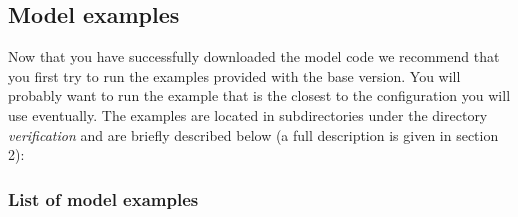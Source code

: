 \subsection{Model examples}

Now that you have successfully downloaded the model code we recommend that
you first try to run the examples provided with the base version. You will
probably want to run the example that is the closest to the configuration
you will use eventually. The examples are located in subdirectories under
the directory \textit{verification} and are briefly described below (a full
description is given in section 2):

\subsubsection{List of model examples}

